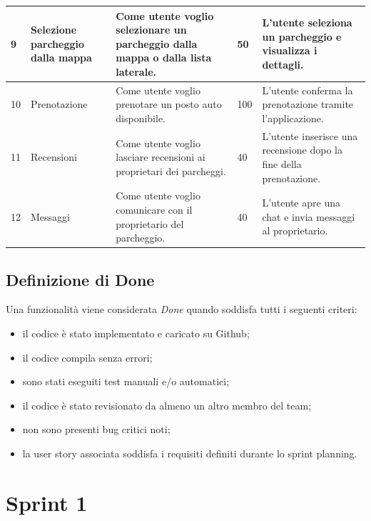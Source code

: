 \documentclass[12pt,a4paper]{article}
\begin{document}
\begin{longtable}{|p{0.7cm}|p{2.5cm}|p{5.8cm}|p{1.3cm}|p{4.2cm}|}
9 & Selezione parcheggio dalla mappa &
Come utente voglio selezionare un parcheggio dalla mappa o dalla lista laterale. &
50 &
L'utente seleziona un parcheggio e visualizza i dettagli. \\
\hline

10 & Prenotazione &
Come utente voglio prenotare un posto auto disponibile. &
100 &
L'utente conferma la prenotazione tramite l'applicazione. \\
\hline

11 & Recensioni &
Come utente voglio lasciare recensioni ai proprietari dei parcheggi. &
40 &
L'utente inserisce una recensione dopo la fine della prenotazione. \\
\hline

12 & Messaggi &
Come utente voglio comunicare con il proprietario del parcheggio. &
40 &
L'utente apre una chat e invia messaggi al proprietario. \\
\hline

\end{longtable}

\normalsize
\vspace{1cm}

\subsection{Definizione di Done}

Una funzionalità viene considerata \textit{Done} quando soddisfa tutti i seguenti criteri:

\begin{itemize}
    \item il codice è stato implementato e caricato su Github;
    \item il codice compila senza errori;
    \item sono stati eseguiti test manuali e/o automatici;
    \item il codice è stato revisionato da almeno un altro membro del team;
    \item non sono presenti bug critici noti;
    \item la user story associata soddisfa i requisiti definiti durante lo sprint planning.
\end{itemize}

\section{Sprint 1}
\end{document}
